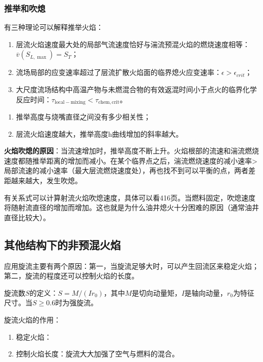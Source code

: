 \subsubsection{推举和吹熄}

有三种理论可以解释推举火焰：
\begin{enumerate}
    \item 层流火焰速度最大处的局部气流速度恰好与湍流预混火焰的燃烧速度相等：\(\overline{v}(S_{L,\max})=S_T\)；
    \item 流场局部的应变速率超过了层流扩散火焰面的临界熄火应变速率：\(\epsilon>\epsilon_{crit}\)；
    \item 大尺度流场结构中高温产物与未燃混合物的有效返混时间小于点火的临界化学反应时间：\(\tau_\mathrm{local-mixing}<\tau_\mathrm{chem,crit}\)。
\end{enumerate}

\begin{enumerate}
    \item 推举高度与烧嘴直径之间没有多少相关性；
    \item 层流火焰速度越大，推举高度h曲线增加的斜率越大。
\end{enumerate}

\textbf{火焰吹熄的原因}：当流速增加时，推举高度不断上升。火焰根部的流速和湍流燃烧速度都随推举距离的增加而减小。在某个临界点之后，湍流燃烧速度的减小速率>局部流速的减小速率（最大层流燃烧速度处），再也找不到可以平衡的点，两者差距越来越大，发生吹熄。


有关系式可以计算射流火焰吹熄速度，具体可以看416页。当燃料固定，吹熄速度将随射流直径的增加而增加。这也就是为什么油井熄火十分困难的原因（通常油井直径比较大）。

\subsection{其他结构下的非预混火焰}
应用旋流主要有两个原因：第一，当旋流足够大时，可以产生回流区来稳定火焰；第二，旋流的程度还可以控制火焰的长度。

旋流数\(S\)的定义：\(S=M/(I r_0)\)，其中\(M\)是切向动量矩，\(I\)是轴向动量，\(r_0\)为特征尺寸。当\(S\ge 0.6\)时为强旋流。

旋流火焰的作用：
\begin{enumerate}
    \item 稳定火焰：
    \item 控制火焰长度：旋流大大加强了空气与燃料的混合。
\end{enumerate}
